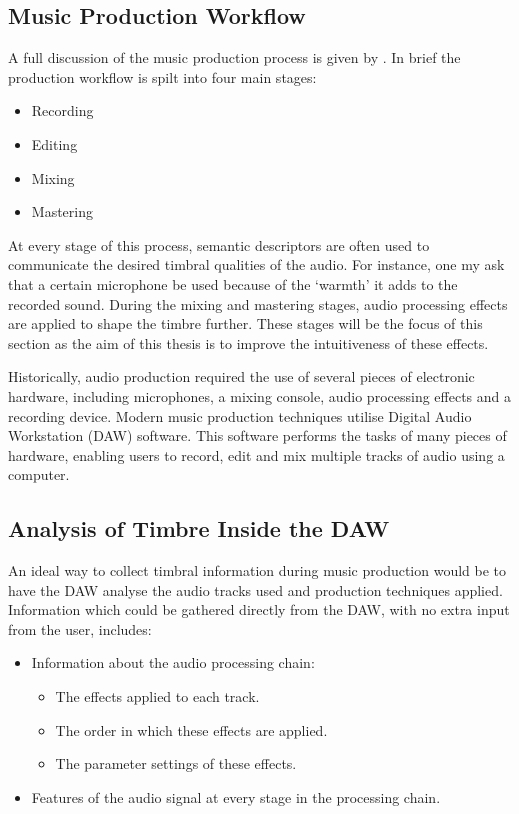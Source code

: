 	\subsection{Music Production Workflow}
	\label{sec:TimbreEvaluation-DAWBasedTimbreEvaluation-Workflow}
		A full discussion of the music production process is given by \citet{dittmar2013audio}. In brief the
		production workflow is spilt into four main stages:

		\begin{itemize}
			\item Recording
			\item Editing
			\item Mixing
			\item Mastering
		\end{itemize}

		At every stage of this process, semantic descriptors are often used to communicate the desired timbral
		qualities of the audio. For instance, one my ask that a certain microphone be used because of the `warmth'
		it adds to the recorded sound. During the mixing and mastering stages, audio processing effects are applied
		to shape the timbre further. These stages will be the focus of this section as the aim of this thesis is
		to improve the intuitiveness of these effects.

		Historically, audio production required the use of several pieces of electronic hardware, including
		microphones, a mixing console, audio processing effects and a recording device. Modern music production
		techniques utilise Digital Audio Workstation (DAW) software. This software performs the tasks of many
		pieces of hardware, enabling users to record, edit and mix multiple tracks of audio using a computer. 
		
	\subsection{Analysis of Timbre Inside the DAW}
	\label{sec:TimbreEvaluation-DAWBasedTimbreEvaluation-InDAW}
		An ideal way to collect timbral information during music production would be to have the DAW analyse the
		audio tracks used and production techniques applied. Information which could be gathered directly from the
		DAW, with no extra input from the user, includes:

		\begin{itemize}
			\item Information about the audio processing chain:
			\begin{itemize}
				\item The effects applied to each track.
				\item The order in which these effects are applied.
				\item The parameter settings of these effects.
			\end{itemize}
			\item Features of the audio signal at every stage in the processing chain.
		\end{itemize}

